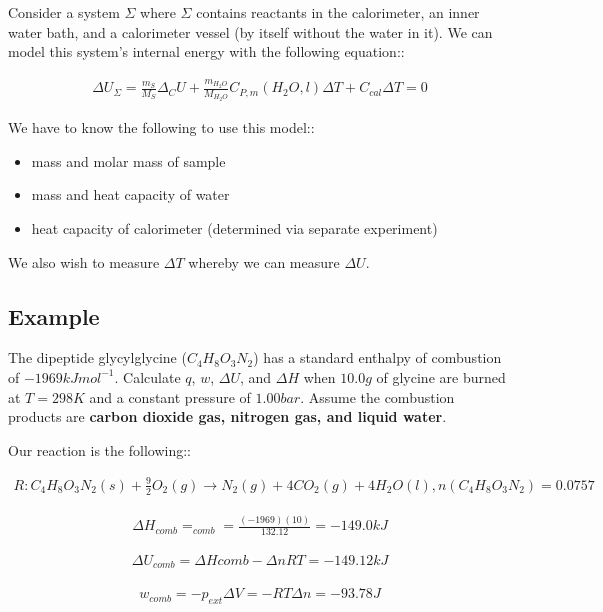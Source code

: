 \documentclass[12pt]{book}
\begin{document}
Consider a system $\Sigma$ where $\Sigma$ contains reactants in the calorimeter, an inner water bath, and a calorimeter vessel (by itself without the water in it). We can model this system's internal energy with the following equation::

\begin{align*}
    \Delta U_{\Sigma}=\frac{m_S}{M_S}\Delta_C U+\frac{m_{H_2O}}{M_{H_2O}}C_{P,m}(H_2O,l)\Delta T+C_{cal}\Delta T=0
\end{align*}

We have to know the following to use this model::

\begin{itemize}
    \item mass and molar mass of sample
    \item mass and heat capacity of water
    \item heat capacity of calorimeter (determined via separate experiment)
\end{itemize}

We also wish to measure $\Delta T$ whereby we can measure $\Delta U$.

\subsection*{Example}
The dipeptide glycylglycine ($C_4H_8O_3N_2$) has a standard enthalpy of combustion of $-1969 kJ mol^{-1}$. Calculate $q$, $w$, $\Delta U$, and $\Delta H$ when $10.0 g$ of glycine are burned at $T = 298 K$ and a constant pressure of $1.00 bar$. Assume the
combustion products are \textbf{carbon dioxide gas, nitrogen gas, and liquid water}.

Our reaction is the following::

\begin{align*}
    R: C_4H_8O_3N_2(s)+\frac{9}{2}O_2(g)\rightarrow N_2(g)+4CO_2(g)+4H_2O(l), n(C_4H_8O_3N_2)=0.0757
\end{align*}


\begin{align*}
    \Delta H_{comb}=_{comb}=\frac{(-1969)(10)}{132.12}=-149.0kJ
\end{align*}

\begin{align*}
    \Delta U_{comb}=\Delta H{comb}-\Delta nRT=-149.12kJ
\end{align*}

\begin{align*}
    w_{comb}=-p_{ext}\Delta V=-RT\Delta n=-93.78J
\end{align*}
\end{document}
